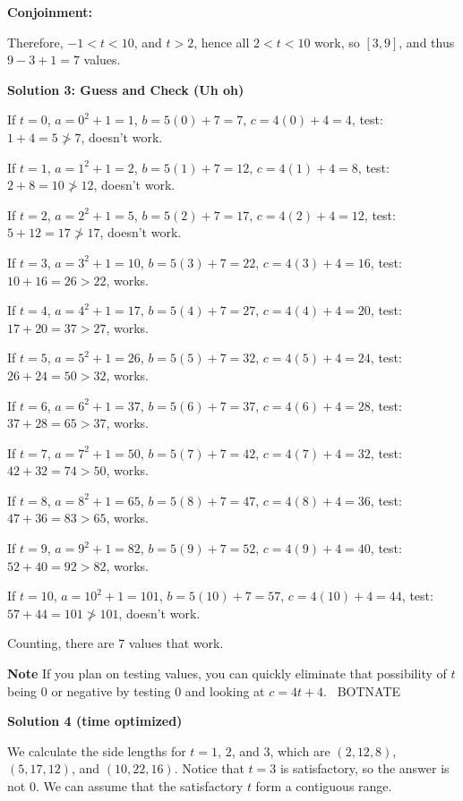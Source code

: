 \begin{enumerate}
 \textbf{Conjoinment:}

 Therefore, $-1 < t < 10$, and $t > 2$, hence all $2 < t < 10$ work, so $[3,9]$, and thus $9-3 + 1 =\boxed{7}$ values.

 


 



\textbf{Solution 3: Guess and Check (Uh oh)}

If $t=0$, $a=0^2 + 1 = 1$, $b=5(0) + 7 = 7$, $c=4(0) + 4 = 4$, test: $1 + 4 = 5 \ngtr 7$, doesn't work.

 If $t=1$, $a=1^2 + 1 = 2$, $b=5(1) + 7 = 12$, $c=4(1) + 4 = 8$, test: $2 + 8 = 10 \ngtr 12$, doesn't work. 

 If $t=2$, $a=2^2 + 1 = 5$, $b=5(2) + 7 = 17$, $c=4(2) + 4 = 12$, test: $5 + 12 = 17 \ngtr 17$, doesn't work. 

 If $t=3$, $a=3^2 + 1 = 10$, $b=5(3) + 7 = 22$, $c=4(3) + 4 = 16$, test: $10 + 16 = 26 > 22$, works. 

 If $t=4$, $a=4^2 + 1 = 17$, $b=5(4) + 7 = 27$, $c=4(4) + 4 = 20$, test: $17 + 20 = 37 > 27$, works. 

 If $t=5$, $a=5^2 + 1 = 26$, $b=5(5) + 7 = 32$, $c=4(5) + 4 = 24$, test: $26 + 24 = 50 > 32$, works. 

 If $t=6$, $a=6^2 + 1 = 37$, $b=5(6) + 7 = 37$, $c=4(6) + 4 = 28$, test: $37 + 28 = 65 > 37$, works. 

 If $t=7$, $a=7^2 + 1 = 50$, $b=5(7) + 7 = 42$, $c=4(7) + 4 = 32$, test: $42 + 32 = 74 > 50$, works. 

 If $t=8$, $a=8^2 + 1 = 65$, $b=5(8) + 7 = 47$, $c=4(8) + 4 = 36$, test: $47 + 36 = 83 > 65$, works. 

 If $t=9$, $a=9^2 + 1 = 82$, $b=5(9) + 7 = 52$, $c=4(9) + 4 = 40$, test: $52 + 40 = 92 > 82$, works. 

 If $t=10$, $a=10^2 + 1 = 101$, $b=5(10) + 7 = 57$, $c=4(10) + 4 = 44$, test: $57 + 44 = 101 \ngtr 101$, doesn't work. 

 Counting, there are $\boxed{7}$ values that work.

 \textbf{Note} If you plan on testing values, you can quickly eliminate that possibility of $t$ being $0$ or negative by testing $0$ and looking at $c=4t+4$. ~BOTNATE

 



\textbf{Solution 4 (time optimized)}

We calculate the side lengths for $t=1$, $2$, and $3$, which are $(2, 12, 8)$, $(5, 17, 12)$, and $(10, 22, 16)$. Notice that $t=3$ is satisfactory, so the answer is not $0$. We can assume that the satisfactory $t$ form a contiguous range.


\end{enumerate}
